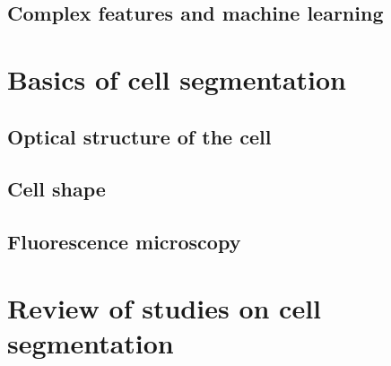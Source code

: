 \subsection{Complex features and machine learning}


\section{Basics of cell segmentation}

\subsection{Optical structure of the cell}


\subsection{Cell shape}


\subsection{Fluorescence microscopy}


\section{Review of studies on cell segmentation}

